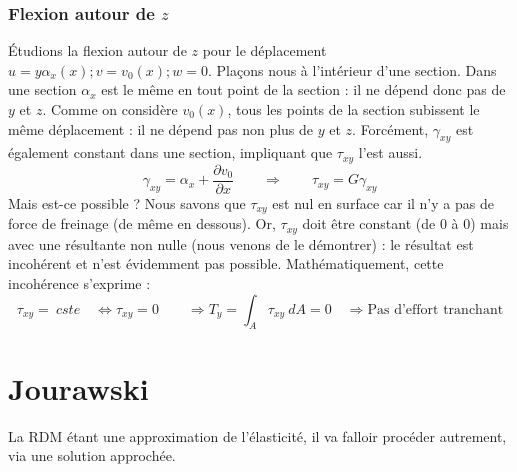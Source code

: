 		\subsubsection{Flexion autour de $z$}
		Étudions la flexion autour de $z$ pour le déplacement $u=y\alpha_x(x); 
		v=v_0(x);w=0$. Plaçons nous à l'intérieur d'une section. Dans une 
		section $\alpha_x$ est le même en tout point de la section : il ne 
		dépend donc pas de $y$ et $z$. Comme on considère $v_0(x)$, tous les 
		points de la section subissent le même déplacement : il ne dépend pas 
		non plus de $y$ et $z$. Forcément, $\gamma_{xy}$ est également 
		constant dans une section, impliquant que $\tau_{xy}$ l'est aussi.
		\begin{equation}
		\gamma_{xy} = \alpha_x + \dfrac{\partial v_0}{\partial x}\qquad
		\Longrightarrow\qquad \tau_{xy} = G\gamma_{xy}
		\end{equation}
		Mais est-ce possible ? Nous savons que $\tau_{xy}$ est nul en surface 
		car il n'y a pas de force de freinage (de même en dessous). Or, 
		$\tau_{xy}$ doit être constant (de 0 à 0) mais avec une résultante 
		non nulle (nous venons de le démontrer) : le résultat est incohérent 
		et n'est évidemment pas possible.  Mathématiquement, cette incohérence 
		s'exprime :
		\begin{equation}
		\tau_{xy} =\ cste\quad \Leftrightarrow \tau_{xy}=0\qquad \Longrightarrow 
		T_y = \int_A \tau_{xy}\ dA = 0\quad \Longrightarrow \text{Pas d'effort 
		tranchant}
		\end{equation}


\section{Jourawski}
La RDM étant une approximation de l'élasticité, il va falloir procéder 
autrement, via une solution approchée.	
	
